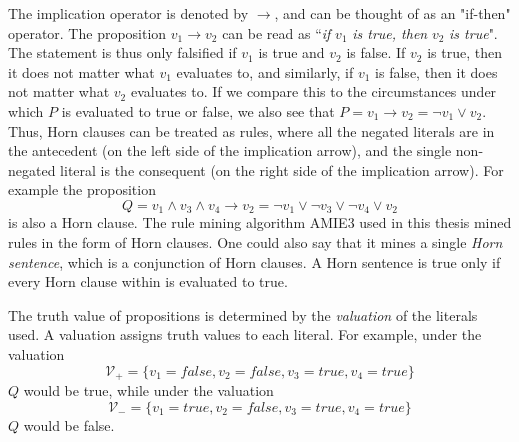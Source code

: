 The implication operator is denoted by $\rightarrow$, and can be thought of as an "if-then" operator. The proposition $v_1 \rightarrow v_2$ can be read as ``\textit{if} $v_1$\textit{ is true, then }$v_2$ \textit{is true}". The statement is thus only falsified if $v_1$ is true and $v_2$ is false. If $v_2$ is true, then it does not matter what $v_1$ evaluates to, and similarly, if $v_1$ is false, then it does not matter what $v_2$ evaluates to. If we compare this to the circumstances under which $P$ is evaluated to true or false, we also see that $P = v_1 \rightarrow v_2 = \neg v_1 \vee v_2$. 
Thus, Horn clauses can be treated as rules, where all the negated literals are in the antecedent (on the left side of the implication arrow), and the single non-negated literal is the consequent (on the right side of the implication arrow). For example the proposition \[Q = v_1 \wedge v_3 \wedge v_4\rightarrow v_2 = \neg v_1 \vee \neg v_3 \vee \neg v_4\vee v_2\] is also a Horn clause. The rule mining algorithm AMIE3 used in this thesis mined rules in the form of Horn clauses. One could also say that it mines a single \textit{Horn sentence}, which is a conjunction of Horn clauses. A Horn sentence is true only if every Horn clause within is evaluated to true.

The truth value of propositions is determined by the \textit{valuation} of the literals used. A valuation assigns truth values to each literal. For example, under the valuation \[\mathcal{V_{+}}=\{v_1 = false, v_2 = false, v_3 = true, v_4 = true\}\] $Q$ would be true, while under the valuation \[\mathcal{V_{-}}=\{v_1 = true, v_2 = false, v_3 = true, v_4 = true\}\] $Q$ would be false.
